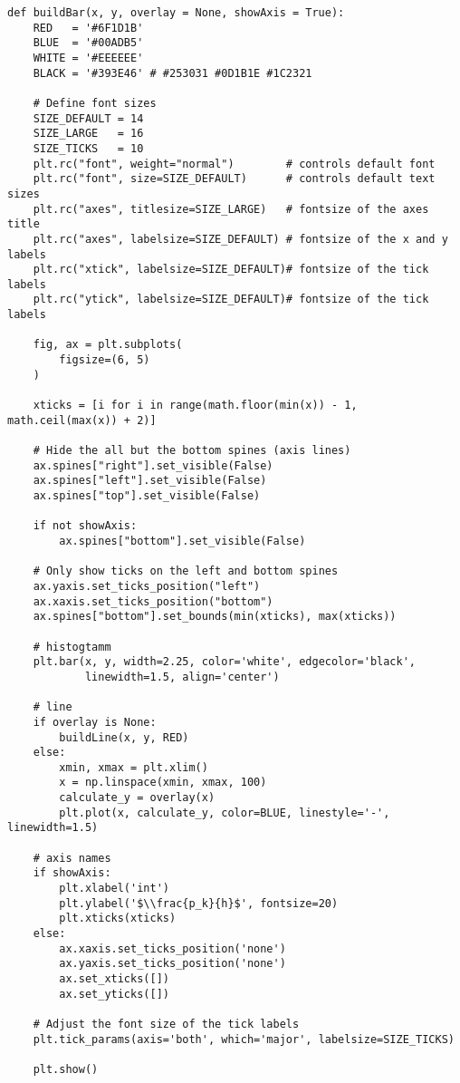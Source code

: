 \documentclass[a4paper, 14pt]{extarticle}
\begin{document}
\begin{lstlisting}
def buildBar(x, y, overlay = None, showAxis = True):
    RED   = '#6F1D1B'
    BLUE  = '#00ADB5'
    WHITE = '#EEEEEE'
    BLACK = '#393E46' # #253031 #0D1B1E #1C2321

    # Define font sizes
    SIZE_DEFAULT = 14
    SIZE_LARGE   = 16
    SIZE_TICKS   = 10
    plt.rc("font", weight="normal")        # controls default font
    plt.rc("font", size=SIZE_DEFAULT)      # controls default text sizes
    plt.rc("axes", titlesize=SIZE_LARGE)   # fontsize of the axes title
    plt.rc("axes", labelsize=SIZE_DEFAULT) # fontsize of the x and y labels
    plt.rc("xtick", labelsize=SIZE_DEFAULT)# fontsize of the tick labels
    plt.rc("ytick", labelsize=SIZE_DEFAULT)# fontsize of the tick labels

    fig, ax = plt.subplots(
        figsize=(6, 5)
    )

    xticks = [i for i in range(math.floor(min(x)) - 1, math.ceil(max(x)) + 2)]

    # Hide the all but the bottom spines (axis lines)
    ax.spines["right"].set_visible(False)
    ax.spines["left"].set_visible(False)
    ax.spines["top"].set_visible(False)

    if not showAxis:
        ax.spines["bottom"].set_visible(False)

    # Only show ticks on the left and bottom spines
    ax.yaxis.set_ticks_position("left")
    ax.xaxis.set_ticks_position("bottom")
    ax.spines["bottom"].set_bounds(min(xticks), max(xticks))

    # histogtamm 
    plt.bar(x, y, width=2.25, color='white', edgecolor='black', 
            linewidth=1.5, align='center')

    # line
    if overlay is None:
        buildLine(x, y, RED)
    else:
        xmin, xmax = plt.xlim()
        x = np.linspace(xmin, xmax, 100)
        calculate_y = overlay(x)
        plt.plot(x, calculate_y, color=BLUE, linestyle='-', linewidth=1.5)

    # axis names
    if showAxis:
        plt.xlabel('int')
        plt.ylabel('$\\frac{p_k}{h}$', fontsize=20)
        plt.xticks(xticks)
    else:
        ax.xaxis.set_ticks_position('none')
        ax.yaxis.set_ticks_position('none')
        ax.set_xticks([])
        ax.set_yticks([])

    # Adjust the font size of the tick labels
    plt.tick_params(axis='both', which='major', labelsize=SIZE_TICKS)

    plt.show()
\end{lstlisting}
\end{document}
